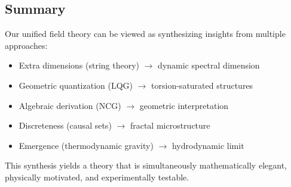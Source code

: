 \subsection{Summary}

Our unified field theory can be viewed as synthesizing insights from multiple approaches:
\begin{itemize}
    \item Extra dimensions (string theory) $\to$ dynamic spectral dimension
    \item Geometric quantization (LQG) $\to$ torsion-saturated structures
    \item Algebraic derivation (NCG) $\to$ geometric interpretation
    \item Discreteness (causal sets) $\to$ fractal microstructure
    \item Emergence (thermodynamic gravity) $\to$ hydrodynamic limit
\end{itemize}

This synthesis yields a theory that is simultaneously mathematically elegant, physically motivated, and experimentally testable.
